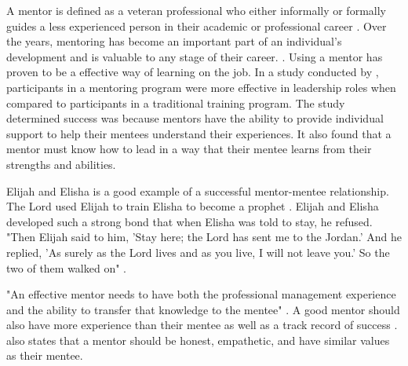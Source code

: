 \documentclass[man]{apa7}
\begin{document}
\setlength{\parindent}{0.5in}
A mentor is defined as a veteran professional who either informally or formally guides a less experienced person in their academic or professional career \parencite{noauthor_what_2019}. Over the years, mentoring has become an important part of an individual's development and is valuable to any stage of their career.  \parencite{nottingham_effective_2017}. Using a mentor has proven to be a effective way of learning on the job. In a study conducted by \textcite{bjursell_mentorship_2018}, participants in a mentoring program were more effective in leadership roles when compared to participants in a traditional training program. The study determined success was because mentors have the ability to provide individual support to help their mentees understand their experiences. It also found that a mentor must know how to lead in a way that their mentee learns from their strengths and abilities.

\setlength{\parindent}{0.5in}
Elijah and Elisha is a good example of a successful mentor-mentee relationship. The Lord used Elijah to train Elisha to become a prophet \parencite{Merida2015}. Elijah and Elisha developed such a strong bond that when Elisha was told to stay, he refused. "Then Elijah said to him, 'Stay here; the Lord has sent me to the Jordan.' And he replied, 'As surely as the Lord lives and as you live, I will not leave you.' So the two of them walked on" \parencite[2 Kings 2:6]{bible}.

\setlength{\parindent}{0.5in}
"An effective mentor needs to have both the professional management experience and the ability to transfer that knowledge to the mentee" \parencite[p. 39]{noauthor_what_2019}. A good mentor should also have more experience than their mentee as well as a track record of success \parencite{nottingham_effective_2017}. \textcite{nottingham_effective_2017} also states that a mentor should be honest, empathetic, and have similar values as their mentee.




\printbibliography
\end{document}
